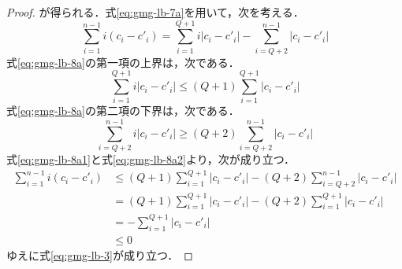\begin{proof}
  が得られる．式\ref{eq:gmg-lb-7a}を用いて，次を考える．
  \begin{equation}
    \label{eq:gmg-lb-8a}
    \sum_{i=1}^{n-1}i(c_i-c'_i)=
    \sum_{i=1}^{Q+1}i|c_i-c'_i|-\sum_{i=Q+2}^{n-1}|c_i-c'_i|
  \end{equation}
  式\ref{eq:gmg-lb-8a}の第一項の上界は，次である．
  \begin{equation}
    \label{eq:gmg-lb-8a1}
    \sum_{i=1}^{Q+1}i|c_i-c'_i|\leq (Q+1)\sum_{i=1}^{Q+1}|c_i-c'_i|
  \end{equation}
  式\ref{eq:gmg-lb-8a}の第二項の下界は，次である．
  \begin{equation}
    \label{eq:gmg-lb-8a2}
    \sum_{i=Q+2}^{n-1}i|c_i-c'_i|\geq (Q+2)\sum_{i=Q+2}^{n-1}|c_i-c'_i|
  \end{equation}
  式\ref{eq:gmg-lb-8a1}と式\ref{eq:gmg-lb-8a2}より，次が成り立つ．
  \begin{align*}
    \sum_{i=1}^{n-1}i(c_i-c'_i)
    &\leq (Q+1)\sum_{i=1}^{Q+1}|c_i-c'_i|-(Q+2)\sum_{i=Q+2}^{n-1}|c_i-c'_i| \\
    &= (Q+1)\sum_{i=1}^{Q+1}|c_i-c'_i|-(Q+2)\sum_{i=1}^{Q+1}|c_i-c'_i| \\
    &= -\sum_{i=1}^{Q+1}|c_i-c'_i| \\
    &\leq 0
  \end{align*}
  ゆえに式\ref{eq:gmg-lb-3}が成り立つ．


\end{proof}
